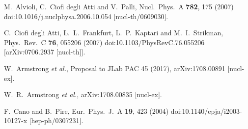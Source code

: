 \documentclass[twocolumn]{revtex4}
\begin{document}
\begin{thebibliography}{25}
  M.~Alvioli, C.~Ciofi degli Atti and V.~Palli,
  Nucl.\ Phys.\ A {\bf 782}, 175 (2007)
  doi:10.1016/j.nuclphysa.2006.10.054
  [nucl-th/0609030].

  C.~Ciofi degli Atti, L.~L.~Frankfurt, L.~P.~Kaptari and M.~I.~Strikman,
  Phys.\ Rev.\ C {\bf 76}, 055206 (2007)
  doi:10.1103/PhysRevC.76.055206
  [arXiv:0706.2937 [nucl-th]].

  W.~Armstrong {\it et al.},
  Proposal to JLab PAC 45 (2017),
  arXiv:1708.00891 [nucl-ex].

  W.~R.~Armstrong {\it et al.},
  arXiv:1708.00835 [nucl-ex].




  F.~Cano and B.~Pire,
  Eur.\ Phys.\ J.\ A {\bf 19}, 423 (2004)
  doi:10.1140/epja/i2003-10127-x
  [hep-ph/0307231].

\end{thebibliography}
\end{document}
